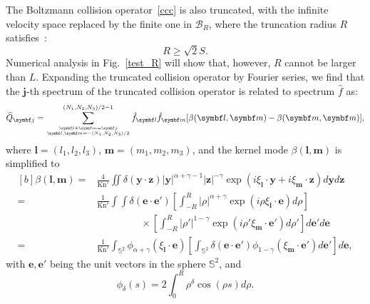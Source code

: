 The Boltzmann collision operator~\eqref{ccc} is also truncated, with the infinite velocity space replaced by the finite one in ${\mathcal{B}_R}$, where the truncation radius $R$ satisfies~\cite{Mouhot2006,Filbet2006}:
\begin{equation}\label{velocity_truncation}
R\ge\sqrt{2}S.
\end{equation} 
Numerical analysis in Fig.~\ref{test_R} will show that, however, $R$ cannot be larger than $L$. Expanding the truncated collision operator by Fourier series, we find that the $\bm{j}$-th spectrum of the truncated collision operator is related to spectrum $\hat{f}$ as:
\begin{equation}\label{mo_monatomic_de}
   \widehat{Q}_{\bm{j}}= \sum_{\bm{l}+\bm{m}=\bm{j} \atop
    \bm{l},\bm{m}=-(N_1,N_2,N_3)/2}^{{(N_1,N_2,N_3)}/2-1}\hat{f}_{\bm{l}}\hat{f}_{\bm{m}}[\beta(\bm{l},\bm{m})-\beta(\bm{m},\bm{m})],
\end{equation}
where $\bm{l}=(l_1,l_2,l_3)$, $\bm{m}=(m_1,m_2,m_3)$, and the kernel mode
$\beta(\bm{l},\bm{m})$ is simplified to 
\begin{equation}\label{kernel_FSM_mode0}
\begin{aligned}[b]
\beta(\bm{l},\bm{m})=&\frac{4}{\text{Kn}'}\iint
\delta(\bm{y}\cdot{\bm{z}})|\bm{y}|^{\alpha+\gamma-1}|\bm{z}|^{-\gamma}
\exp(i\xi_{\bm{l}}\cdot{\bm{y}}+i\xi_{\bm{m}}\cdot{\bm{z}})d\bm{y}d\bm{z}\\
   =&\frac{1}{\text{Kn}'}\int\int \delta(\bm{e}\cdot{\bm{e}'})
              \left[\int_{-R}^R|\rho|^{\alpha+\gamma}\exp(i\rho\xi_{\bm{l}}\cdot{\bm{e}})d\rho\right]\\
              &\ \ \ \ \ \ \ \ \ \ \ \ \ \ \ \ \ \ \ \ \times\left[\int_{-R}^R|\rho'|^{1-\gamma}\exp(i\rho'\xi_{\bm{m}}\cdot{\bm{e}'})d\rho'\right]d\bm{e}'d\bm{e} \\
=&\frac{1}{\text{Kn}'}\int_{\mathbb{S}^2}
    \phi_{\alpha+\gamma}(\xi_{\bm{l}}\cdot{\bm{e}})
    \left[\int_{\mathbb{S}^2}\delta(\bm{e}\cdot{\bm{e}'})\phi_{1-\gamma}(\xi_{\bm{m}}\cdot{}\bm{e}')d\bm{e}'\right]d\bm{e},
\end{aligned}
\end{equation}
with $\bm{e}, \bm{e}'$ being the unit vectors in the sphere $\mathbb{S}^{2}$, and
\begin{equation}\label{phi_FSM_expression}
    \phi_\delta(s)=2\int_{0}^R\rho^\delta\cos\left(\rho{s}\right)d\rho.
\end{equation}


